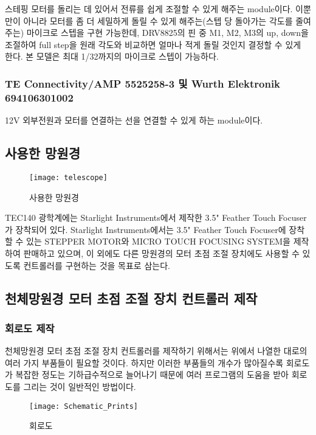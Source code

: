 스테핑 모터를 돌리는 데 있어서 전류를 쉽게 조절할 수 있게 해주는 module이다. 이뿐만이 아니라 모터를 좀 더 세밀하게 돌릴 수 있게 해주는(스텝 당 돌아가는 각도를 줄여주는) 마이크로 스텝을 구현 가능한데, DRV8825의 핀 중 M1, M2, M3의 up, down을 조절하여 full step을 원래 각도와 비교하면 얼마나 적게 돌릴 것인지 결정할 수 있게 한다. 본 모델은 최대 1/32까지의 마이크로 스텝이 가능하다.

\subsubsection{TE Connectivity/AMP 5525258-3 및 Wurth Elektronik 694106301002}

12V 외부전원과 모터를 연결하는 선을 연결할 수 있게 하는 module이다.

\subsection{사용한 망원경}

\begin{wrapfigure}{l}{0.14\textwidth}
	\texttt{[image: telescope]}
	\caption{사용한 망원경}
	\label{fig:telescope}
\end{wrapfigure}
TEC140 광학계에는 Starlight Instruments에서 제작한 3.5" Feather Touch Focuser가 장착되어 있다. Starlight Instruments에서는 3.5" Feather Touch Focuser에 장착할 수 있는 STEPPER MOTOR와 MICRO TOUCH FOCUSING SYSTEM을 제작하여 판매하고 있으며, 이 외에도 다른 망원경의 모터 초점 조절 장치에도 사용할 수 있도록 컨트롤러를 구현하는 것을 목표로 삼는다.

\subsection{천체망원경 모터 초점 조절 장치 컨트롤러 제작}

\subsubsection{회로도 제작}

천체망원경 모터 초점 조절 장치 컨트롤러를 제작하기 위해서는 위에서 나열한 대로의 여러 가지 부품들이 필요할 것이다. 하지만 이러한 부품들의 개수가 많아질수록 회로도가 복잡한 정도는 기하급수적으로 늘어나기 때문에 여러 프로그램의 도움을 받아 회로도를 그리는 것이 일반적인 방법이다.

\begin{figure}
	\texttt{[image: Schematic\_Prints]}
	\caption{회로도}
	\label{fig:Schematic_Prints}
\end{figure}

